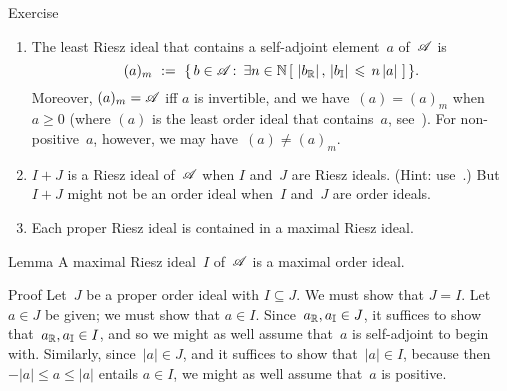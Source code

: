 \documentclass[a]{subfiles}
\begin{document}
\begin{parsec}
\begin{point}{Exercise}
\begin{enumerate}
\item
The least Riesz ideal that contains a self-adjoint element~$a$
of~$\mathscr{A}$ is
\begin{equation*}
(a)_m\ :=\ \{\,b\in \mathscr{A}\colon\, 
\exists n\in \mathbb{N}\,[\ \left|b_{\mathbb{R}}\right|,\,\left|b_{\mathbb{I}}\right|
\,\leqslant\, n\left|a\right| \ ]\,\}.
\end{equation*}
Moreover,  $(a)_m=\mathscr{A}$ iff $a$ is invertible,
and we have~$(a)=(a)_m$ when~$a\geq 0$
(where $(a)$ is the least order ideal that contains~$a$,
see~).
For non-positive~$a$, however, we may have~$(a)\neq (a)_m$.
\item
$I+J$ is a Riesz ideal of~$\mathscr{A}$
when $I$ and~$J$ are Riesz ideals. (Hint: use~.)
But~$I+J$ might not be an order ideal
when~$I$ and~$J$ are order ideals.

\item
Each proper Riesz ideal is contained in a maximal Riesz ideal.
\end{enumerate}
\end{point}
\begin{point}{Lemma}%
A maximal Riesz ideal~$I$ of~$\mathscr{A}$
is a maximal order ideal.
\begin{point}{Proof}%
Let~$J$ be a proper order ideal with $I\subseteq J$.
We must show that $J=I$.
Let~$a\in J$ be given;
we must show that $a\in I$.
Since~$a_{\mathbb{R}},a_{\mathbb{I}}\in J$,
it suffices to show that~$a_{\mathbb{R}},a_{\mathbb{I}}\in I$,
and so we might as well assume that~$a$ is self-adjoint
to begin with.
Similarly,
since~$\left|a\right|\in J$,
and it suffices to show that~$\left|a\right|\in I$,
because then $-\left|a\right|\leq a\leq \left|a\right|$
entails $a\in I$,
we might as well assume that~$a$ is positive.


\end{point}
\end{point}
\end{parsec}
\end{document}
